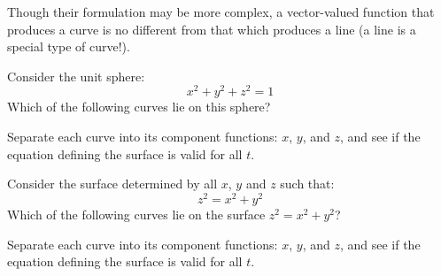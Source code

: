 \documentclass{ximera}
\begin{document}
Though their formulation may be more complex, a vector-valued function
that produces a curve is no different from that which produces a line
(a line is a special type of curve!).

\begin{question}
  Consider the unit sphere:
  \[
  x^2+y^2+z^2 = 1
  \]
  Which of the following curves lie on this sphere?
  \begin{hint}
    Separate each curve into its component functions: $x$, $y$, and
    $z$, and see if the equation defining the surface is valid for all
    $t$.
  \end{hint}
  \begin{selectAll}
  \end{selectAll}
\end{question}




\begin{question}
  Consider the surface determined by all $x$, $y$ and $z$ such that:
  \[
  z^2=x^2+y^2
  \]
  Which of the following curves lie on the surface $z^2=x^2+y^2$?
  \begin{hint}
    Separate each curve into its component functions: $x$, $y$, and
    $z$, and see if the equation defining the surface is valid for all
    $t$.
  \end{hint}
  \begin{selectAll}
  \end{selectAll}
\end{question}
\end{document}

